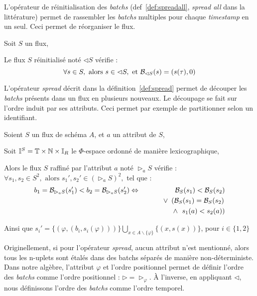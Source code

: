 L'opérateur de réinitialisation des \textit{batchs} (def~\ref{def:spreadall}, \textit{spread all} dans la littérature) permet de rassembler les \textit{batchs} multiples pour chaque \textit{timestamp} en un seul. Ceci permet de réorganiser le flux.
\begin{defi}\label{def:spreadall}
Soit $S$ un flux,

Le flux $S$ réinitialisé noté $\lhd S$ vérifie :
$$\forall s\in S, \textrm{ alors } s \in \lhd S, \textrm{ et }\mathcal{B}_{\lhd S}(s) = (s(\tau),0)$$
\end{defi}

L'opérateur \textit{spread} décrit dans la définition~\ref{def:spread} permet de découper les \textit{batchs} présents dans un flux en plusieurs nouveaux. Le découpage se fait sur l'ordre induit par ses attributs. Ceci permet par exemple de partitionner selon un identifiant.
\begin{defi}\label{def:spread}
Soient $S$ un flux de schéma $A$, et $a$ un attribut de $S$,

Soit $\mathbb{I}^S = \mathbb{T}\times\mathbb{N}\times \mathbb{I}_R$ le $\Phi$-espace ordonné de manière lexicographique,

Alors le flux $S$ raffiné par l'attribut $a$ noté $\rhd_{a} S$ vérifie :
$\forall s_1, s_2\in S^2, \textrm{ alors } s_1', s_2' \in (\rhd_a S)^2,$ tel que :
\begin{eqnarray*}
b_1=\mathcal{B}_{\rhd_a S}(s_1') < b_2=\mathcal{B}_{\rhd_a S}(s_2') &\Leftrightarrow & \mathcal{B}_S (s_1) < \mathcal{B}_S (s_2)\\ & & \quad \vee \ \left(\mathcal{B}_S (s_1) = \mathcal{B}_S (s_2)\right. \\ & & \quad\quad \quad\quad\wedge \ \left.s_1(a) < s_2(a)\right)
\end{eqnarray*}

Ainsi que $s_i' = \{(\varphi, (b_i,s_i(\varphi)))\}\bigcup_{x\in A\backslash\{\varphi\}}\{(x,s(x))\}$, pour $i\in\{1,2\}$
\end{defi}

Originellement, si pour l'opérateur \textit{spread}, aucun attribut n'est mentionné, alors tous les n-uplets sont étalés dans des batchs séparés de manière non-déterministe. Dans notre algèbre, l'attribut $\varphi$ et l'ordre positionnel permet de définir l'ordre des \textit{batchs} comme l'ordre positionnel : $\rhd = \rhd_\varphi$. À l'inverse, en appliquant $\lhd$, nous définissons l'ordre des \textit{batchs} comme l'ordre temporel.

